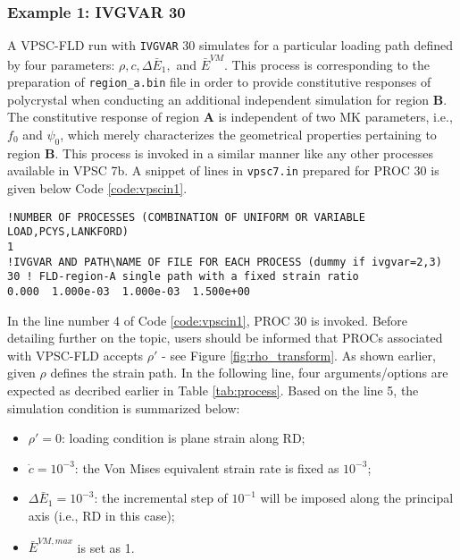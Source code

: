 \documentclass[12pt]{amsart}
\begin{document}
\subsubsection{Example 1: IVGVAR 30}
\label{sec:ex1}
A VPSC-FLD run with \verb$IVGVAR$ 30 simulates for a particular loading path defined by four parameters: $\rho, c, \Delta{\bar{E}_1},$ and $\bar{E}^{VM}$.
This process is corresponding to the preparation of \verb$region_a.bin$ file in order to provide constitutive responses of polycrystal when conducting an additional independent simulation for region \textbf{B}.
The constitutive response of region \textbf{A} is independent of two MK parameters, i.e., $f_0$ and $\psi_0$, which merely characterizes the geometrical properties pertaining to region \textbf{B}.
This process is invoked in a similar manner like any other processes available in VPSC 7b.
A snippet of lines in \verb$vpsc7.in$ prepared for PROC 30 is given below Code \ref{code:vpscin1}.
\begin{lstlisting}[style=inp, caption=A portion of the input file vpsc7.in, label={code:vpscin1}]
!NUMBER OF PROCESSES (COMBINATION OF UNIFORM OR VARIABLE LOAD,PCYS,LANKFORD)
1
!IVGVAR AND PATH\NAME OF FILE FOR EACH PROCESS (dummy if ivgvar=2,3)
30 ! FLD-region-A single path with a fixed strain ratio
0.000  1.000e-03  1.000e-03  1.500e+00
\end{lstlisting}
In the line number 4 of Code \ref{code:vpscin1}, PROC 30 is invoked.
Before detailing further on the topic, users should be informed that PROCs associated with VPSC-FLD accepts $\rho'$ - see Figure \ref{fig:rho_transform}.
As shown earlier, given $\rho$ defines the strain path.
In the following line, four arguments/options are expected as decribed earlier in Table \ref{tab:process}.
Based on the line 5, the simulation condition is summarized below:
\begin{itemize}
  \item $\rho'=0$: loading condition is plane strain along RD;
  \item $\dot{c}=10^{-3}$: the Von Mises equivalent strain rate is fixed as $10^{-3}$;
  \item $\Delta{\bar{E}}_{1}=10^{-3}$: the incremental step of $10^{-1}$ will be imposed along the principal axis (i.e., RD in this case);
  \item $\bar{E}^{VM, max}$ is set as 1.
\end{itemize}
\end{document}
